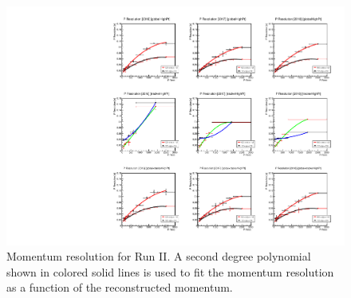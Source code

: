 \begin{figure}[tph]
  \centering
  \includegraphics[width=.9\textwidth]{fig/MomentumResolution/ResolutionMeasurement.pdf}
  \caption{Momentum resolution for Run II. A second degree polynomial shown in
    colored solid lines is used to fit the momentum resolution as a function of
    the reconstructed momentum.}
  \label{fig:ResolutionMeasurement}
\end{figure}


